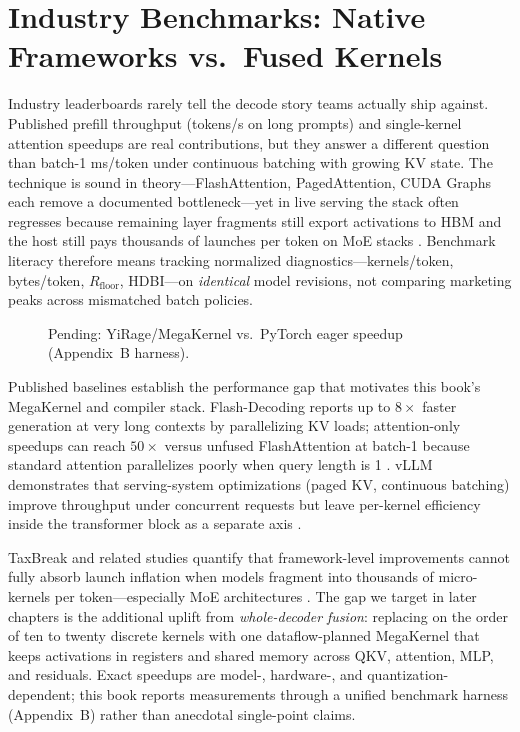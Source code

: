 \section{Industry Benchmarks: Native Frameworks vs.\ Fused Kernels}
\label{sec:benchmark_gap}

Industry leaderboards rarely tell the decode story teams actually ship against.
Published prefill throughput (tokens/s on long prompts) and single-kernel attention speedups are real contributions, but they answer a different question than batch-1 ms/token under continuous batching with growing KV state.
The technique is sound in theory---FlashAttention, PagedAttention, CUDA Graphs each remove a documented bottleneck---yet in live serving the stack often regresses because remaining layer fragments still export activations to HBM and the host still pays thousands of launches per token on MoE stacks \citep{taxbreak2026,kwon2023vllm}.
Benchmark literacy therefore means tracking normalized diagnostics---kernels/token, bytes/token, $R_{\mathrm{floor}}$, HDBI---on \emph{identical} model revisions, not comparing marketing peaks across mismatched batch policies.

\begin{figure}[t]
\centering
{}
\caption{Pending: YiRage/MegaKernel vs.\ PyTorch eager speedup (Appendix~B harness).}
\label{fig:fusion_gap}
\end{figure}


Published baselines establish the performance gap that motivates this book's MegaKernel and compiler stack.
Flash-Decoding reports up to $8\times$ faster generation at very long contexts by parallelizing KV loads; attention-only speedups can reach $50\times$ versus unfused FlashAttention at batch-1 because standard attention parallelizes poorly when query length is 1 \citep{dao2023flashdecoding,dao2022flashattention}.
vLLM demonstrates that serving-system optimizations (paged KV, continuous batching) improve throughput under concurrent requests but leave per-kernel efficiency inside the transformer block as a separate axis \citep{kwon2023vllm}.

TaxBreak and related studies quantify that framework-level improvements cannot fully absorb launch inflation when models fragment into thousands of micro-kernels per token---especially MoE architectures \citep{taxbreak2026}.
The gap we target in later chapters is the additional uplift from \emph{whole-decoder fusion}: replacing on the order of ten to twenty discrete kernels with one dataflow-planned MegaKernel that keeps activations in registers and shared memory across QKV, attention, MLP, and residuals.
Exact speedups are model-, hardware-, and quantization-dependent; this book reports measurements through a unified benchmark harness (Appendix~B) rather than anecdotal single-point claims.

